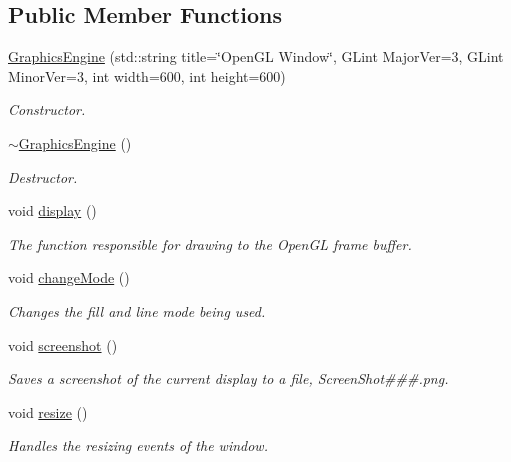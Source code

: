 \subsection*{Public Member Functions}
\begin{DoxyCompactItemize}
\item 
\hyperlink{class_graphics_engine_a458fa2b36f864e0820a0a54ad58ff1c3}{Graphics\+Engine} (std\+::string title=\char`\"{}Open\+GL Window\char`\"{}, G\+Lint Major\+Ver=3, G\+Lint Minor\+Ver=3, int width=600, int height=600)
\begin{DoxyCompactList}\small\item\em Constructor. \end{DoxyCompactList}\item 
\hyperlink{class_graphics_engine_ab67afeefbc9f1c284f6ce310c31ae8f6}{$\sim$\+Graphics\+Engine} ()
\begin{DoxyCompactList}\small\item\em Destructor. \end{DoxyCompactList}\item 
void \hyperlink{class_graphics_engine_a2f0bdf1a47bf9e8d4f1c9525c2ebc8f9}{display} ()
\begin{DoxyCompactList}\small\item\em The function responsible for drawing to the Open\+GL frame buffer. \end{DoxyCompactList}\item 
\mbox{\label{class_graphics_engine_a7f549d3ad00c34e61d067fdd2a911034}} 
void \hyperlink{class_graphics_engine_a7f549d3ad00c34e61d067fdd2a911034}{change\+Mode} ()
\begin{DoxyCompactList}\small\item\em Changes the fill and line mode being used. \end{DoxyCompactList}\item 
\mbox{\label{class_graphics_engine_a7b12982b41cbdb107f48863798be2ed7}} 
void \hyperlink{class_graphics_engine_a7b12982b41cbdb107f48863798be2ed7}{screenshot} ()
\begin{DoxyCompactList}\small\item\em Saves a screenshot of the current display to a file, Screen\+Shot\#\#\#.png. \end{DoxyCompactList}\item 
void \hyperlink{class_graphics_engine_a6a38e40ee4227a8b53dddf07f92323ee}{resize} ()
\begin{DoxyCompactList}\small\item\em Handles the resizing events of the window. \end{DoxyCompactList}\item 

\end{DoxyCompactItemize}
